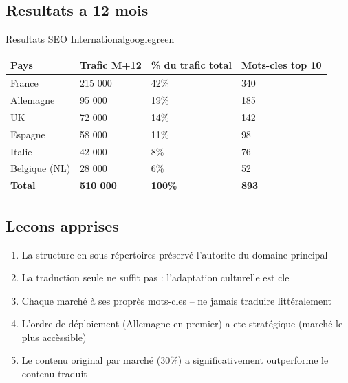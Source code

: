 \subsection{Resultats a 12 mois}

\begin{mybox}{Resultats SEO International}{googlegreen}
\begin{tabular}{llll}
    \toprule
    \textbf{Pays} & \textbf{Trafic M+12} & \% du trafic total & \textbf{Mots-cles top 10} \\
    \midrule
    France        & 215 000              & 42\%               & 340 \\
    Allemagne     & 95 000               & 19\%               & 185 \\
    UK            & 72 000               & 14\%               & 142 \\
    Espagne       & 58 000               & 11\%               & 98 \\
    Italie        & 42 000               & 8\%                & 76 \\
    Belgique (NL) & 28 000               & 6\%                & 52 \\
    \midrule
    \textbf{Total} & \textbf{510 000}    & \textbf{100\%}     & \textbf{893} \\
    \bottomrule
\end{tabular}
\end{mybox}

\subsection{Lecons apprises}
\begin{enumerate}
    \item La structure en sous-répertoires préservé l'autorite du domaine principal
    \item La traduction seule ne suffit pas : l'adaptation culturelle est cle
    \item Chaque marché à ses proprès mots-cles -- ne jamais traduire littéralement
    \item L'ordre de déploiement (Allemagne en premier) a ete stratégique (marché le plus accèssible)
    \item Le contenu original par marché (30\%) a significativement outperforme le contenu traduit
\end{enumerate}


